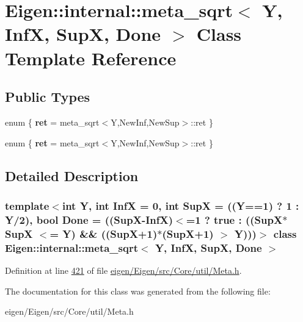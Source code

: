 \hypertarget{class_eigen_1_1internal_1_1meta__sqrt}{}\section{Eigen\+:\+:internal\+:\+:meta\+\_\+sqrt$<$ Y, InfX, SupX, Done $>$ Class Template Reference}
\label{class_eigen_1_1internal_1_1meta__sqrt}
\subsection*{Public Types}
\begin{DoxyCompactItemize}
\item 
\mbox{\label{class_eigen_1_1internal_1_1meta__sqrt_a6ee0328ee2a8d7120c06b915b49a9fa0}} 
enum \{ {\bfseries ret} = meta\+\_\+sqrt$<$Y,New\+Inf,New\+Sup$>$\+:\+:ret
 \}
\item 
\mbox{\label{class_eigen_1_1internal_1_1meta__sqrt_a4345feb05c66260d0eab6d6f1fba62f7}} 
enum \{ {\bfseries ret} = meta\+\_\+sqrt$<$Y,New\+Inf,New\+Sup$>$\+:\+:ret
 \}
\end{DoxyCompactItemize}


\subsection{Detailed Description}
\subsubsection*{template$<$int Y, int InfX = 0, int SupX = ((\+Y==1) ? 1 \+: Y/2), bool Done = ((\+Sup\+X-\/\+Inf\+X)$<$=1 ? true \+: ((\+Sup\+X$\ast$\+Sup\+X $<$= Y) \&\& ((\+Sup\+X+1)$\ast$(\+Sup\+X+1) $>$ Y)))$>$\newline
class Eigen\+::internal\+::meta\+\_\+sqrt$<$ Y, Inf\+X, Sup\+X, Done $>$}



Definition at line \hyperlink{eigen_2_eigen_2src_2_core_2util_2_meta_8h_source_l00421}{421} of file \hyperlink{eigen_2_eigen_2src_2_core_2util_2_meta_8h_source}{eigen/\+Eigen/src/\+Core/util/\+Meta.\+h}.



The documentation for this class was generated from the following file\+:\begin{DoxyCompactItemize}
\item 
eigen/\+Eigen/src/\+Core/util/\+Meta.\+h\end{DoxyCompactItemize}
